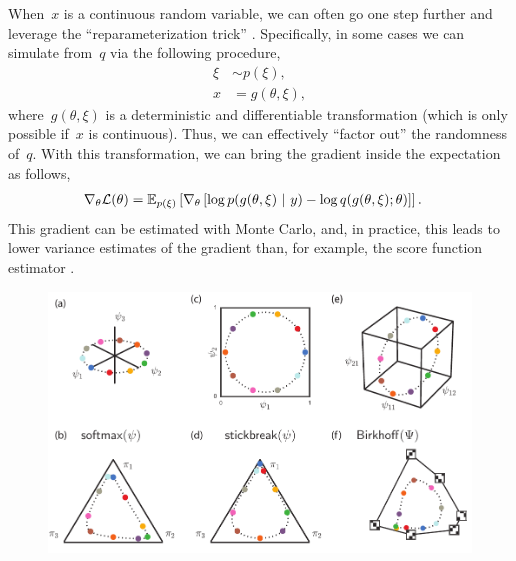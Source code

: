 \documentclass{article}
\begin{document}
When~$x$ is a continuous random variable, we can often go one step
further and leverage the ``reparameterization trick''  \citep{Salimans2013,Kingma2014,Price1958,Bonnet1964}.  Specifically,
in some cases we can simulate from~$q$ via the following procedure,
\begin{align}
\xi &\sim p(\xi),  \\
x &= g(\theta, \xi),
\end{align}
where~$g(\theta, \xi)$ is a deterministic and differentiable
transformation (which is only possible if~$x$ is continuous). Thus, we
can effectively ``factor out'' the randomness of~$q$. With this
transformation, we can bring the gradient inside the expectation as
follows,
\begin{align}
  \nabla_\theta \mathcal{L}(\theta) 
  &= \mathbb{E}_{p(\xi)} \left[ \nabla_\theta \left[\log p(g(\theta, \xi) ~\vert~ y) - \log q(g(\theta, \xi); \theta) \right] \right].
\end{align}
This gradient can be estimated with Monte Carlo, and, in practice,
this leads to lower variance estimates of the gradient than, for
example, the score function estimator \citep{Williams1992,Glynn1990}.

\begin{figure}[t]
  \centering
  \includegraphics[width=5.in]{../figures/figure1.pdf} 
  \caption{
  }
\label{fig:transforms}
\end{figure}
\end{document}
